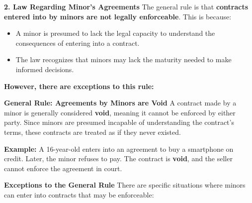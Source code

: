 \documentclass[12pt,a4paper]{book}
\begin{document}
\textbf{2. Law Regarding Minor's Agreements}  
The general rule is that \textbf{contracts entered into by minors are not legally enforceable}. This is because:
\begin{itemize}
    \item A minor is presumed to lack the legal capacity to understand the consequences of entering into a contract.
    \item The law recognizes that minors may lack the maturity needed to make informed decisions.
\end{itemize}

\textbf{However, there are exceptions to this rule:}

\vspace{0.3cm}

\textbf{General Rule: Agreements by Minors are Void}  
A contract made by a minor is generally considered \textbf{void}, meaning it cannot be enforced by either party. Since minors are presumed incapable of understanding the contract's terms, these contracts are treated as if they never existed.

\textbf{Example:}  
A 16-year-old enters into an agreement to buy a smartphone on credit. Later, the minor refuses to pay. The contract is \textbf{void}, and the seller cannot enforce the agreement in court.

\vspace{0.3cm}

\textbf{Exceptions to the General Rule}  
There are specific situations where minors can enter into contracts that may be enforceable:
\end{document}

